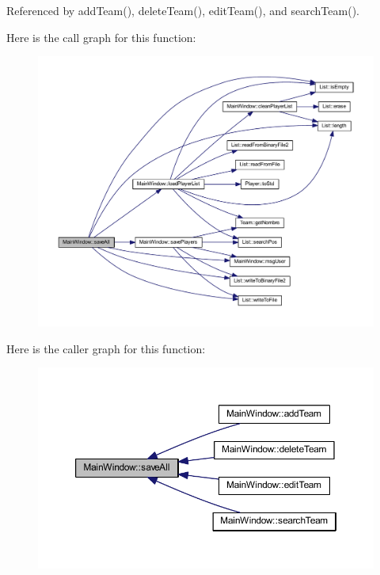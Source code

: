 Referenced by add\+Team(), delete\+Team(), edit\+Team(), and search\+Team().



Here is the call graph for this function\+:\nopagebreak
\begin{figure}[H]
\begin{center}
\leavevmode
\includegraphics[width=350pt]{d9/dc6/class_main_window_a149085ca2d6cce59ecb59dcbf0892c07_cgraph}
\end{center}
\end{figure}




Here is the caller graph for this function\+:\nopagebreak
\begin{figure}[H]
\begin{center}
\leavevmode
\includegraphics[width=350pt]{d9/dc6/class_main_window_a149085ca2d6cce59ecb59dcbf0892c07_icgraph}
\end{center}
\end{figure}



